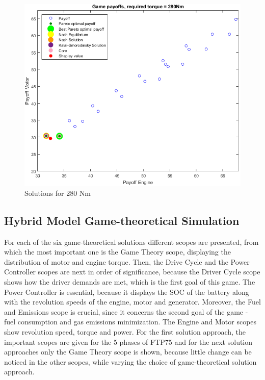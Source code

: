 \begin{figure}[h]
  	\centering
	\includegraphics[scale=0.59]{figures/gametheory/280nm}
  	\caption{Solutions for 280 Nm}
  	\label{fig:280nm}
\end{figure}

\subsection{Hybrid Model Game-theoretical Simulation}

For each of the six game-theoretical solutions different scopes are presented, from which the most important one is the Game Theory scope, displaying the distribution of motor and engine torque. Then, the Drive Cycle and the Power Controller scopes are next in order of significance, because the Driver Cycle scope shows how the driver demands are met, which is the first goal of this game. The Power Controller is essential, because it displays the SOC of the battery along with the revolution speeds of the engine, motor and generator. Moreover, the Fuel and Emissions scope is crucial, since it concerns the second goal of the game - fuel consumption and gas emissions minimization. The Engine and Motor scopes show revolution speed, torque and power. For the first solution approach, the important scopes are given for the 5 phases of FTP75 and for the next solution approaches only the Game Theory scope is shown, because little change can be noticed in the other scopes, while varying the choice of game-theoretical solution approach.

